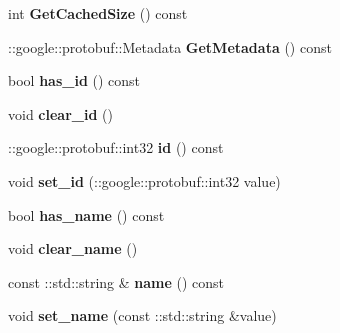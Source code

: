 \begin{DoxyCompactItemize}
\item 
\hypertarget{classSimpleChat_1_1User_abf5060695e86b14ca602e7453fc95360}{int {\bfseries Get\-Cached\-Size} () const }\label{classSimpleChat_1_1User_abf5060695e86b14ca602e7453fc95360}

\item 
\hypertarget{classSimpleChat_1_1User_a56cdcadf584c69e52f1bb8913b067940}{\-::google\-::protobuf\-::\-Metadata {\bfseries Get\-Metadata} () const }\label{classSimpleChat_1_1User_a56cdcadf584c69e52f1bb8913b067940}

\item 
\hypertarget{classSimpleChat_1_1User_ae369bb25f05d002d445fc7d244d78841}{bool {\bfseries has\-\_\-id} () const }\label{classSimpleChat_1_1User_ae369bb25f05d002d445fc7d244d78841}

\item 
\hypertarget{classSimpleChat_1_1User_ac7977c56651293b1efd5bbea639a45ce}{void {\bfseries clear\-\_\-id} ()}\label{classSimpleChat_1_1User_ac7977c56651293b1efd5bbea639a45ce}

\item 
\hypertarget{classSimpleChat_1_1User_aaa41321499ba3bc60f8d0df0acabde32}{\-::google\-::protobuf\-::int32 {\bfseries id} () const }\label{classSimpleChat_1_1User_aaa41321499ba3bc60f8d0df0acabde32}

\item 
\hypertarget{classSimpleChat_1_1User_a42e7249ccc18c7d421a00c4560c7d6e3}{void {\bfseries set\-\_\-id} (\-::google\-::protobuf\-::int32 value)}\label{classSimpleChat_1_1User_a42e7249ccc18c7d421a00c4560c7d6e3}

\item 
\hypertarget{classSimpleChat_1_1User_a4fa8407eb36f302de9afeb58670202c0}{bool {\bfseries has\-\_\-name} () const }\label{classSimpleChat_1_1User_a4fa8407eb36f302de9afeb58670202c0}

\item 
\hypertarget{classSimpleChat_1_1User_a4d9132c14159dcd3484f2e66a460338d}{void {\bfseries clear\-\_\-name} ()}\label{classSimpleChat_1_1User_a4d9132c14159dcd3484f2e66a460338d}

\item 
\hypertarget{classSimpleChat_1_1User_a8c1951e1c1b3600ca2c6936e7f210521}{const \-::std\-::string \& {\bfseries name} () const }\label{classSimpleChat_1_1User_a8c1951e1c1b3600ca2c6936e7f210521}

\item 
\hypertarget{classSimpleChat_1_1User_aad7063635c8f76c6cb7a5d39f9968d12}{void {\bfseries set\-\_\-name} (const \-::std\-::string \&value)}\label{classSimpleChat_1_1User_aad7063635c8f76c6cb7a5d39f9968d12}


\end{DoxyCompactItemize}
